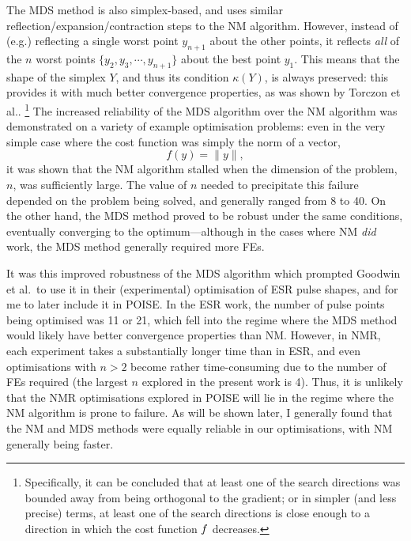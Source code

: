 The MDS method is also simplex-based, and uses similar reflection/expansion/contraction steps to the NM algorithm.
However, instead of (e.g.) reflecting a single worst point $y_{n+1}$ about the other points, it reflects \textit{all} of the $n$ worst points $\{y_2, y_3, \cdots, y_{n+1}\}$ about the best point $y_1$.
This means that the shape of the simplex $Y$, and thus its condition $\kappa(Y)$, is always preserved: this provides it with much better convergence properties, as was shown by Torczon et al.\autocite{Torczon1989,Torczon1991SIAMJO}.%
\footnote{Specifically, it can be concluded that at least one of the search directions was bounded away from being orthogonal to the gradient; or in simpler (and less precise) terms, at least one of the search directions is close enough to a direction in which the cost function $f\/$ decreases.}
The increased reliability of the MDS algorithm over the NM algorithm was demonstrated on a variety of example optimisation problems: even in the very simple case where the cost function was simply the norm of a vector,
\begin{equation}
    \label{eq:norm_cf}
    f(y) = \lVert y \rVert,
\end{equation}
it was shown that the NM algorithm stalled when the dimension of the problem, $n$, was sufficiently large.
The value of $n$ needed to precipitate this failure depended on the problem being solved, and generally ranged from 8 to 40.
On the other hand, the MDS method proved to be robust under the same conditions, eventually converging to the optimum---although in the cases where NM \textit{did} work, the MDS method generally required more FEs.

It was this improved robustness of the MDS algorithm which prompted Goodwin et al.\ to use it in their (experimental) optimisation of ESR pulse shapes\autocite{Goodwin2018JMR}, and for me to later include it in POISE.
In the ESR work, the number of pulse points being optimised was 11 or 21, which fell into the regime where the MDS method would likely have better convergence properties than NM.
However, in NMR, each experiment takes a substantially longer time than in ESR, and even optimisations with $n > 2$ become rather time-consuming due to the number of FEs required (the largest $n$ explored in the present work is 4).
Thus, it is unlikely that the NMR optimisations explored in POISE will lie in the regime where the NM algorithm is prone to failure.
As will be shown later, I generally found that the NM and MDS methods were equally reliable in our optimisations, with NM generally being faster.
